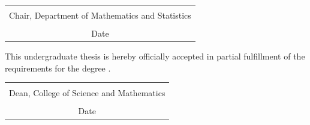 {\vfill

\begin{center}
	\begin{tabular}{c}
		\sigblank{\deptchair}\\
		{\footnotesize Chair, Department of Mathematics and Statistics}\\
		\makebox[1in]{\hrulefill}\\[-3pt]
		{\footnotesize Date}
	\end{tabular}
\end{center}

This undergraduate thesis is hereby officially accepted in partial fulfillment of the requirements for the degree \program.

\vfill

\begin{center}
	\begin{tabular}{c}
		\sigblank{\csmdean}\\
		{\footnotesize Dean, College of Science and Mathematics}\\
		\makebox[1in]{\hrulefill}\\[-3pt]
		{\footnotesize Date}
	\end{tabular}
\end{center}
}%
\restoregeometry